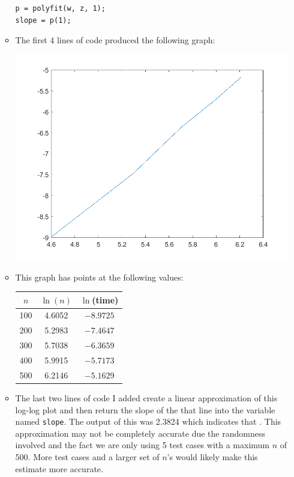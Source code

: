 \documentclass[10pt,a4paper]{article}
\theoremstyle{definition}
\theoremstyle{definition}
\numberwithin{equation}{section}
\begin{document}
\begin{enumerate}[label = (\alph*)]
\begin{itemize}
\begin{verbatim}
p = polyfit(w, z, 1);
slope = p(1);
	\end{verbatim}
	\item The first 4 lines of code produced the following graph:
	\begin{center}
	\includegraphics[scale=.8]{LogLog}
	\end{center}
	\item This graph has points at the following values:
		\begin{center}
	\begin{tabular}{ |c|c|c| } 
 	\hline
 	$n$  & $\ln(n)$ & $\ln$(time)\\ 
 	\hline
 	100 & 4.6052 & $-8.9725$\\ 
 	200 & 5.2983 & $-7.4647$\\ 
 	300 & 5.7038 & $-6.3659$\\
 	400 & 5.9915 & $-5.7173$\\
 	500 & 6.2146 & $-5.1629$\\
 	\hline
	\end{tabular}
	\end{center}
	\item The last two lines of code I added create a linear approximation of this log-log plot and then return the slope of the that line into the variable named \verb!slope!. The output of this was 2.3824 which indicates that . This approximation may not be completely accurate due the randomness involved and the fact we are only using 5 test cases with a maximum $n$ of 500. More test cases and a larger set of $n$'s would likely make this estimate more accurate. 
	\end{itemize}
\end{enumerate}
\end{document}
